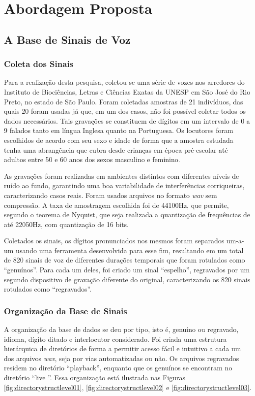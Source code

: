 \chapter{Abordagem Proposta} \label{chap:propApproach}
	\section{A Base de Sinais de Voz}
	    \subsection{Coleta dos Sinais}
		\par Para a realização desta pesquisa, coletou-se uma série de vozes nos arredores do Instituto de Biociências, Letras e Ciências Exatas da UNESP em São José do Rio Preto, no estado de São Paulo. Foram coletadas amostras de 21 indivíduos, das quais 20 foram usadas já que, em um dos casos, não foi possível coletar todos os dados necessários. Tais gravações se constituem de dígitos em um intervalo de 0 a 9 falados tanto em língua Inglesa quanto na Portuguesa. Os locutores foram escolhidos de acordo com seu sexo e idade de forma que a amostra estudada tenha uma abrangência que cubra desde crianças em época pré-escolar até adultos entre 50 e 60 anos dos sexos masculino e feminino.
					
		\par As gravações foram realizadas em ambientes distintos com diferentes níveis de ruído ao fundo, garantindo uma boa variabilidade de interferências corriqueiras, caracterizando casos reais. Foram usados arquivos no formato \textit{wav} sem compressão. A taxa de amostragem escolhida foi de 44100Hz, que permite, segundo o teorema de Nyquist, que seja realizada a quantização de frequências de até 22050Hz, com quantização de 16 bits.
		
		\par Coletados os sinais, os dígitos pronunciados nos mesmos foram separados um-a-um usando uma ferramenta desenvolvida para esse fim, resultando em um total de 820 sinais de voz de diferentes durações temporais que foram rotulados como ``genuínos''. Para cada um deles, foi criado um sinal ``espelho'',  regravados por um segundo dispositivo de gravação diferente do original, caracterizando os 820 sinais rotulados como ``regravados''.

	    \subsection{Organização da Base de Sinais}
		\par A organização da base de dados se deu por tipo, isto é, genuíno ou regravado, idioma, dígito ditado e interlocutor considerado. Foi criada uma estrutura hierárquica de diretórios de forma a permitir acesso fácil e intuitivo a cada um dos arquivos \textit{wav}, seja por vias automatizadas ou não. Os arquivos regravados residem no diretório ``playback'', enquanto que os genuínos se encontram no diretório ``live ''.	Essa organização está ilustrada nas Figuras \ref{fig:directorystructlevel01}, \ref{fig:directorystructlevel02} e \ref{fig:directorystructlevel03}.
		
